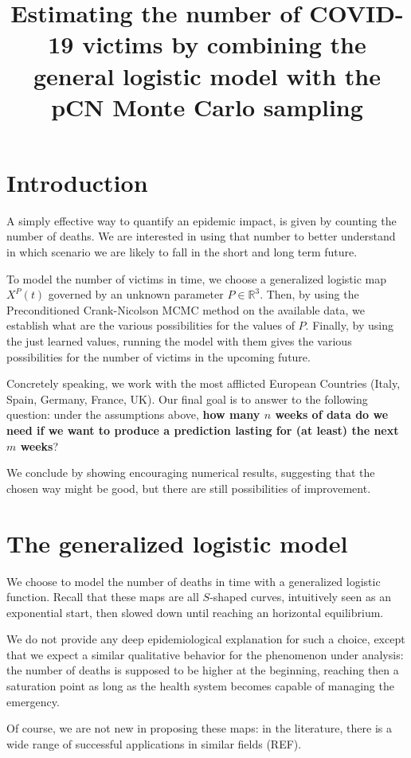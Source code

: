 \documentclass[8pt]{article}
\title {Estimating the number of COVID-19 victims by combining the
general logistic model with the pCN Monte Carlo sampling}
\begin{document}
\maketitle
\section{Introduction}
A simply effective way to quantify an epidemic
impact, is given by counting the number of deaths.
We are interested in using that number
to better understand in which scenario we are likely to fall 
in the short and long term future.


To model the number of victims in time, we choose
a generalized logistic map $X^P(t)$ governed by an unknown parameter 
$P \in \mathbb{R}^3$. Then, by using the Preconditioned Crank-Nicolson
MCMC method on the available data,
we establish what are the various possibilities
for the  
values of $P$. Finally, by using the just learned values,
running the model with them gives the various possibilities
for the number of victims in the upcoming future.


Concretely speaking, we work with the most afflicted European Countries
(Italy, Spain, Germany, France, UK). Our final
goal is to answer to the following question:
under the assumptions above,
\textbf{
how many $n$ weeks of data do we need if we want to produce a prediction 
lasting for (at least) the next $m$ weeks}?


We conclude by showing encouraging numerical results, suggesting that
the chosen way might be good, but there are still possibilities of improvement.

\section {The generalized logistic model}
We choose to model the number of deaths in time with a
generalized logistic function. 
Recall that these maps are all
$S$-shaped curves, intuitively seen as an exponential start,
then slowed down until reaching an horizontal equilibrium. 


We do not provide any deep epidemiological explanation for such a choice,
except that we expect a similar qualitative behavior for the phenomenon
under analysis: the number of deaths is supposed to be higher at the beginning,
reaching then a saturation point as long as the health system becomes
capable of managing the emergency.


Of course, we are not new in proposing these maps: in the literature,
there is a wide range of successful applications in similar fields (REF).
\end{document}
